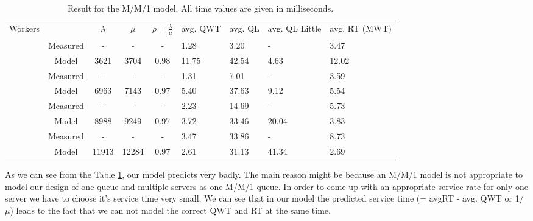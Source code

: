 \documentclass[11pt,a4paper]{article}
\begin{document}
\begin{table}[H]
    \centering
    \begin{tabular}{|c|c|c|c|c|p{1.5cm}|p{1.5cm}|p{1.5cm}|p{1.5cm}|} \hline
            Workers &      & $\lambda$ & $\mu$   & $\rho = \frac{\lambda}{\mu}$ & avg. QWT   & avg. QL   &  avg. QL Little & avg. RT (MWT)  \\ \Xhline{4\arrayrulewidth}
         \multirow{2}{*}{8} & Measured &     -    &     -        &   -                       &  1.28    &  3.20      &  -                & 3.47 \\ \cline{2-9}
            & Model    &  3621    &      3704   &  0.98                      & 11.75      & 42.54     & 4.63              & 12.02 \\ \Xhline{3\arrayrulewidth}
         
         \multirow{ 2}{*}{16} & Measured &   -      &     -       &   -                   &    1.31       &    7.01           &      -             &    3.59    \\ \cline{2-9}
         & Model    &   6963      &   7143         &       0.97               &    5.40       &       37.63        &      9.12           &   5.54    \\ \Xhline{3\arrayrulewidth}
         
         \multirow{ 2}{*}{32} &Measured &   -      &     -       &   -                   &    2.23       &      14.69         &      -             &   5.73    \\ \cline{2-9}
         & Model    &   8988     &   9249        &      0.97                &      3.72    &      33.46   &        20.04          &  3.83     \\ \Xhline{3\arrayrulewidth}
         
         \multirow{ 2}{*}{64} &Measured &   -      &     -       &   -                   &     3.47      &     33.86          &      -             &    8.73   \\ \cline{2-9}
         & Model    &   11913      &    12284        &      0.97                &    2.61       &      31.13         &     41.34              &    2.69   \\ \hline
    \end{tabular}
    \caption{Result for the M/M/1 model. All time values are given in milliseconds.}
    \label{tab:queueing:mm1}
\end{table}

As we can see from the Table \ref{tab:queueing:mm1}, our model predicts very badly. The main reason might be because an M/M/1 model is not appropriate to model our design of one queue and multiple servers as one M/M/1 queue. In order to come up with an appropriate service rate for only one server we have to choose it's service time very small. We can see that in our model the predicted service time (= avgRT - avg. QWT or 1/$\mu$) leads to the fact that we can not model the correct QWT and RT at the same time.
\end{document}
